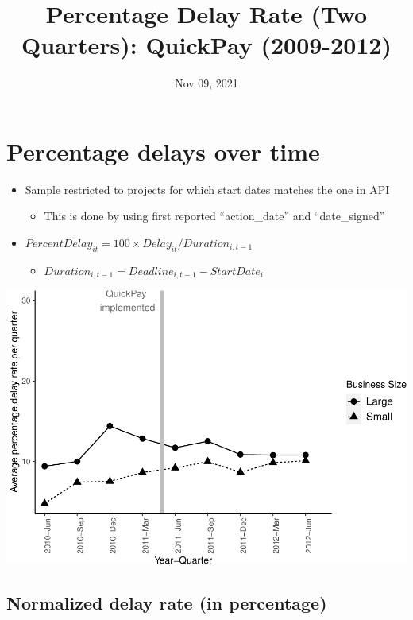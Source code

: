 \documentclass[
]{article}
\title{Percentage Delay Rate (Two Quarters): QuickPay (2009-2012)}
\author{}
\date{\vspace{-2.5em}Nov 09, 2021}
\providecommand{\tightlist}{%
  \setlength{\itemsep}{0pt}\setlength{\parskip}{0pt}}
\begin{document}
\maketitle

\hypertarget{percentage-delays-over-time}{%
\section{Percentage delays over
time}\label{percentage-delays-over-time}}

\begin{itemize}
\tightlist
\item
  Sample restricted to projects for which start dates matches the one in
  API

  \begin{itemize}
  \tightlist
  \item
    This is done by using first reported ``action\_date'' and
    ``date\_signed''
  \end{itemize}
\item
  \(PercentDelay_{it}=100 \times Delay_{it}/Duration_{i,t-1}\)

  \begin{itemize}
  \tightlist
  \item
    \(Duration_{i,t-1} = Deadline_{i,t-1} - StartDate_i\)
  \end{itemize}
\end{itemize}

\includegraphics{qp_first_pc_delay_two_quarters_files/figure-latex/plot_pc_delay-1.pdf}

\hypertarget{normalized-delay-rate-in-percentage}{%
\subsection{Normalized delay rate (in
percentage)}\label{normalized-delay-rate-in-percentage}}
\end{document}
